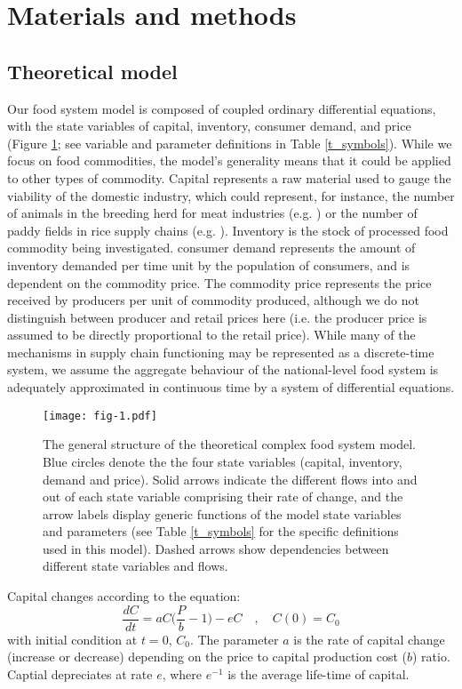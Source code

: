 \documentclass[12pt]{article}
\begin{document}
\section{Materials and methods}


\subsection{Theoretical model}
Our food system model is composed of coupled ordinary differential equations, with the state variables of capital, inventory, consumer demand, and price (Figure \ref{fig_cfs}; see variable and parameter definitions in Table \ref{t_symbols}). While we focus on food commodities, the model's generality means that it could be applied to other types of commodity. Capital represents a raw material used to gauge the viability of the domestic industry, which could represent, for instance, the number of animals in the breeding herd for meat industries (e.g. \cite{meadows1971}) or the number of paddy fields in rice supply chains (e.g. \cite{chung2018}). Inventory is the stock of processed food commodity being investigated. consumer demand represents the amount of inventory demanded per time unit by the population of consumers, and is dependent on the commodity price. The commodity price represents the price received by producers per unit of commodity produced, although we do not distinguish between producer and retail prices here (i.e. the producer price is assumed to be directly proportional to the retail price). While many of the mechanisms in supply chain functioning may be represented as a discrete-time system, we assume the aggregate behaviour of the national-level food system is adequately approximated in continuous time by a system of differential equations.

\begin{figure}[t!]
  \centering
  \texttt{[image: fig-1.pdf]}
  \caption{The general structure of the theoretical complex food system model. Blue circles denote the the four state variables (capital, inventory, demand and price). Solid arrows indicate the different flows into and out of each state variable comprising their rate of change, and the arrow labels display generic functions of the model state variables and parameters (see Table \ref{t_symbols} for the specific definitions used in this model). Dashed arrows show dependencies between different state variables and flows.}
  \label{fig_cfs}
\end{figure}

Capital changes according to the equation:
%
\begin{equation}
  \frac{dC}{dt} = a C \Big(\frac{P}{b} - 1\Big) - e C \quad, \quad C(0) = C_0
  \label{eq_capital}
\end{equation}
%
with initial condition at $t = 0$, $C_0$. The parameter $a$ is the rate of capital change (increase or decrease) depending on the price to capital production cost ($b$) ratio. Captial depreciates at rate $e$, where $e^{-1}$ is the average life-time of capital.
\end{document}
